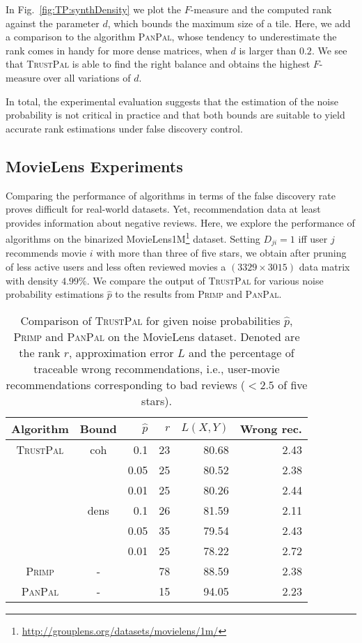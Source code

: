 In Fig.~\ref{fig:TP:synthDensity} we plot the $F$-measure and the computed rank against the parameter $d$, which bounds the maximum size of a tile. Here, we add a comparison to the algorithm \textsc{PanPal}, whose tendency to underestimate the rank comes in handy for more dense matrices, when $d$ is larger than $0.2$.  We see that \textsc{TrustPal} is able to find the right balance and obtains the highest $F$-measure over all variations of $d$.  

In total, the experimental evaluation suggests that the estimation of the noise probability is not critical in practice and that both bounds are suitable to yield accurate rank estimations under false discovery control.
\subsection{MovieLens Experiments}
Comparing the performance of algorithms in terms of the false discovery rate proves difficult for real-world datasets. Yet, recommendation data at least provides information about negative reviews. Here, we explore the performance of algorithms on the binarized MovieLens1M\footnote{\url{http://grouplens.org/datasets/movielens/1m/}} dataset. Setting  $D_{ji}=1$ iff user $j$ recommends movie $i$ with more than three of five stars, we obtain after pruning of less active users and less often reviewed movies a $(3329\times 3015)$ data matrix with density $4.99\%$. We compare the output of \textsc{TrustPal} for various noise probability estimations $\hat{p}$ to the results from \textsc{Primp} and \textsc{PanPal}.
\begin{table}
\centering
	\begin{tabular}{ccrrrr}\toprule
     Algorithm & Bound& $\hat{p}$& $r$ & $L(X,Y)$ & Wrong rec.\\ \midrule
\textsc{TrustPal} & coh & 0.1	&23	&80.68	&2.43\\
 & & 0.05	&25	&80.52	&2.38\\
 & & 0.01	&25	&80.26	&2.44\\
 & dens & 0.1	&26	&81.59	&2.11\\
 & & 0.05	&35	&79.54	&2.43\\
 & & 0.01	&25	&78.22	&2.72\\
\textsc{Primp} &-&& 78 & 88.59 & 2.38\\
\textsc{PanPal} &-&& 15 & 94.05 & 2.23\\
\bottomrule
\end{tabular}
\caption{Comparison of \textsc{TrustPal} for given noise probabilities $\hat{p}$, \textsc{Primp} and \textsc{PanPal} on the MovieLens dataset. Denoted are the rank $r$, approximation error $L$ and the percentage of traceable wrong recommendations, i.e., user-movie recommendations corresponding to bad reviews ($<2.5$ of five stars).}
\label{tbl:TP:movielens}
\end{table}

